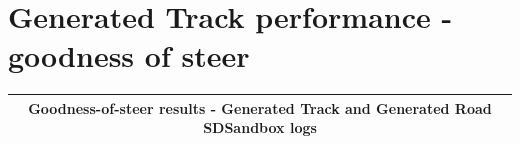 \section{Generated Track performance - goodness of steer}
\begin{table}[]
\begin{center}
\begin{tabular}{|l|l|l|l|l|l|}
\hline
\multicolumn{6}{|c|}{Goodness-of-steer results - Generated Track and Generated Road SDSandbox logs} \\ \hline




\end{tabular}
\end{center}
\end{table}
